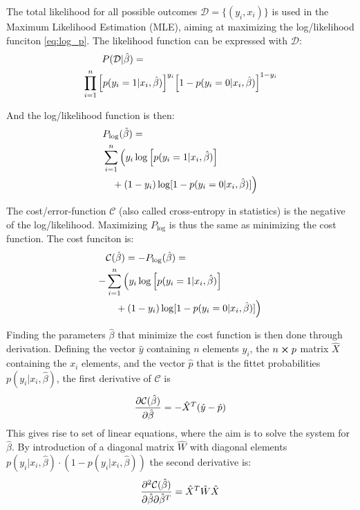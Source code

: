 The total likelihood for all possible outcomes $\mathcal{D}=\{(y_i,x_i)\}$ is used in the Maximum Likelihood Estimation (MLE), aiming at maximizing the log/likelihood funciton \eqref{eq:log_p}. The likelihood function can be expressed with $\mathcal{D}$:
\begin{equation*}
\begin{split}
    &\qquad P(\mathcal{D}|\hat{\beta}) = \\
    &\prod_{i=1}^n \qty[p(y_i = 1|x_i,\hat{\beta}) ]^{y_i}  \qty[1 - p(y_i = 0|x_i,\hat{\beta})]^{1-y_i}
\end{split}
\end{equation*}

And the log/likelihood function is then:
\begin{equation}
\begin{split}
    &P_{\log}(\hat{\beta}) = \\
    &\sum_{i=1}^n \Big(y_i \log \qty[p(y_i = 1|x_i,\hat{\beta})] \\
    &\quad+ (1-y_i) \log [1 - p(y_i = 0|x_i,\hat{\beta})]\Big)
\end{split}
\label{eq:log_p}
\end{equation}

The cost/error-function $\mathcal{C}$ (also called cross-entropy in statistics) is the negative of the log/likelihood. Maximizing $P_{\log}$ is thus the same as minimizing the cost function. The cost funciton is:
\begin{equation}
  \begin{split}
    &\mathcal{C}(\hat{\beta}) = - P_{\log}(\hat{\beta}) =  \\
    -&\sum_{i=1}^n \Big(y_i \log \qty[p(y_i = 1|x_i,\hat{\beta})] \\
    &\quad+ (1-y_i) \log [1 - p(y_i = 0|x_i,\hat{\beta})]\Big)
  \end{split}
\end{equation}

Finding the parameters $\hat{\beta}$ that minimize the cost function is then done through derivation.
Defining the vector $\hat{y}$ containing $n$ elements $y_i$, the $n \cross p$ matrix $\hat{X}$ containing the $x_i$ elements, and the vector $\hat{p}$ that is the fittet probabilities $p(y_i|x_i,\hat{\beta})$, the first derivative of $\mathcal{C}$ is
\begin{equation}
  \pdv{\mathcal{C}(\hat{\beta})}{\hat{\beta}} = - \hat{X}^T (\hat{y}-\hat{p})
  \label{eq:cost_d}
\end{equation}
This gives rise to set of linear equations, where the aim is to solve the system for $\hat{\beta}$.
By introduction of a diagonal matrix $\hat{W}$ with diagonal elements $p(y_i|x_i,\hat{\beta})\cdot(1-p(y_i|x_i,\hat{\beta}))$ the second derivative is:
\begin{equation}
 \pdv[2]{\mathcal{C}(\hat{\beta})}{\hat{\beta}}{\hat{\beta}^T} = \hat{X}^T\hat{W}\hat{X}
 \label{eq:cost_dd}
\end{equation}


